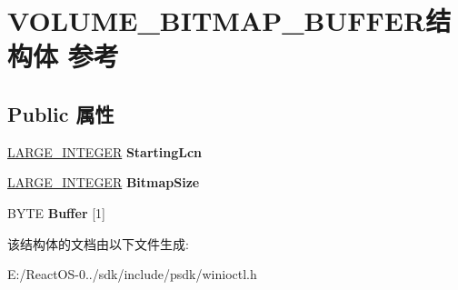 \hypertarget{struct_v_o_l_u_m_e___b_i_t_m_a_p___b_u_f_f_e_r}{}\section{V\+O\+L\+U\+M\+E\+\_\+\+B\+I\+T\+M\+A\+P\+\_\+\+B\+U\+F\+F\+E\+R结构体 参考}
\label{struct_v_o_l_u_m_e___b_i_t_m_a_p___b_u_f_f_e_r}
\subsection*{Public 属性}
\begin{DoxyCompactItemize}
\item 
\mbox{\label{struct_v_o_l_u_m_e___b_i_t_m_a_p___b_u_f_f_e_r_aef17e20dc665fcd7125d9a2c1df843fa}} 
\hyperlink{union___l_a_r_g_e___i_n_t_e_g_e_r}{L\+A\+R\+G\+E\+\_\+\+I\+N\+T\+E\+G\+ER} {\bfseries Starting\+Lcn}
\item 
\mbox{\label{struct_v_o_l_u_m_e___b_i_t_m_a_p___b_u_f_f_e_r_a1c403f6afe6a5c3f142af2f51e8c11a0}} 
\hyperlink{union___l_a_r_g_e___i_n_t_e_g_e_r}{L\+A\+R\+G\+E\+\_\+\+I\+N\+T\+E\+G\+ER} {\bfseries Bitmap\+Size}
\item 
\mbox{\label{struct_v_o_l_u_m_e___b_i_t_m_a_p___b_u_f_f_e_r_a33525f97c09dab8f7892e1aadcc4c491}} 
B\+Y\+TE {\bfseries Buffer} \mbox{[}1\mbox{]}
\end{DoxyCompactItemize}


该结构体的文档由以下文件生成\+:\begin{DoxyCompactItemize}
\item 
E\+:/\+React\+O\+S-\/0../sdk/include/psdk/winioctl.\+h\end{DoxyCompactItemize}
